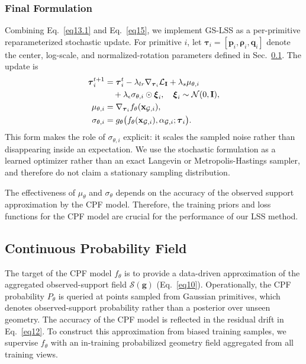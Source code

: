 \documentclass[lettersize,journal]{IEEEtran}
\begin{document}
\subsubsection{Final Formulation}

Combining Eq.~\ref{eq13.1} and Eq.~\ref{eq15}, we implement GS-LSS as a per-primitive reparameterized stochastic update. For primitive $i$, let $\boldsymbol{\tau}_i=[\mathbf{p}_i,\boldsymbol{\rho}_i,\mathbf{q}_i]$ denote the center, log-scale, and normalized-rotation parameters defined in Sec.~\ref{sec:cpf}. The update is
\begin{align}
    \boldsymbol{\tau}_i^{t+1}
    &= \boldsymbol{\tau}_i^{t}
    - \lambda_{lr}\nabla_{\boldsymbol{\tau}_i}\mathcal{L}_{\mathbf{I}}
    + \lambda_s \mu_{\theta,i} \notag\\
    &\quad
    + \lambda_{\epsilon}\sigma_{\theta,i}\odot\boldsymbol{\xi}_i,
    \quad \boldsymbol{\xi}_i\sim\mathcal{N}(0,\mathbf{I}), \label{eq16}\\
    \mu_{\theta,i} &= \nabla_{\boldsymbol{\tau}_i} f_{\theta}(\mathbf{x}_{\mathcal{G},i}), \label{eq17}\\
    \sigma_{\theta,i} &=
    g_{\theta}\big(f_{\theta}(\mathbf{x}_{\mathcal{G},i}),\alpha_{\mathcal{G},i}; \boldsymbol{\tau}_i\big). \label{eq18}
\end{align}
This form makes the role of $\sigma_{\theta,i}$ explicit: it scales the sampled noise rather than disappearing inside an expectation. We use the stochastic formulation as a learned optimizer rather than an exact Langevin or Metropolis-Hastings sampler, and therefore do not claim a stationary sampling distribution.

The effectiveness of $\mu_{\theta}$ and $\sigma_{\theta}$ depends on the accuracy of the observed support approximation by the CPF model. Therefore, the training priors and loss functions for the CPF model are crucial for the performance of our LSS method.

\subsection{Continuous Probability Field}\label{sec:cpf}

The target of the CPF model $f_{\theta}$ is to provide 
a data-driven approximation of the aggregated observed-support field $\mathcal{S}(\mathbf{g})$ (Eq.~\ref{eq10}).
{Operationally, the CPF probability $P_{\theta}$ is queried at points sampled from Gaussian primitives, which denotes observed-support probability rather than a posterior over unseen geometry.}
The accuracy of the CPF model is reflected in the residual drift in Eq.~\ref{eq12}.
To construct this approximation from biased training samples, we supervise $f_{\theta}$ with an in-training probabilized geometry field aggregated from all training views.
\end{document}
